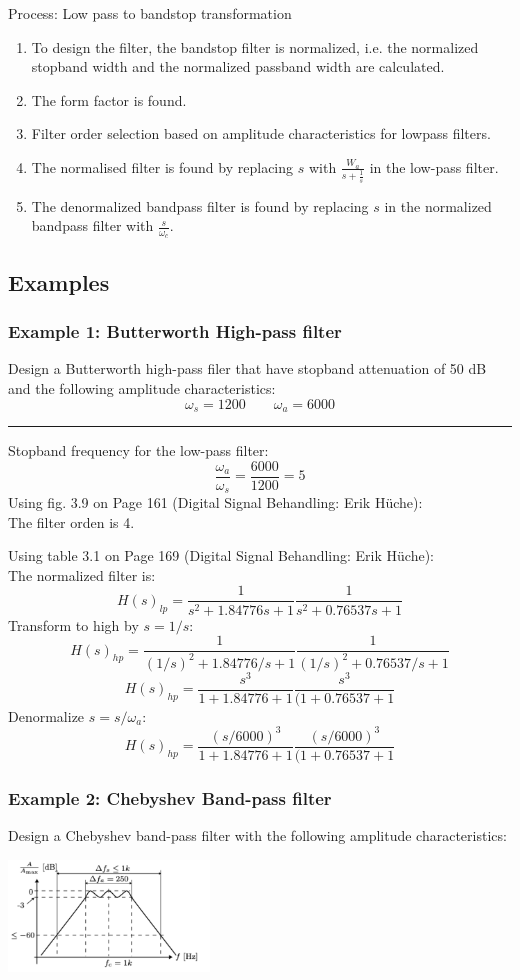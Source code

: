 Process: Low pass to bandstop transformation
\begin{enumerate}
  \item To design the filter, the bandstop filter is normalized, i.e. the normalized stopband width and the normalized passband width are calculated.
  \item The form factor is found.
  \item Filter order selection based on amplitude characteristics for lowpass filters.
  \item The normalised filter is found by replacing $s$ with $\frac{W_{a}}{s+\frac{1}{s}}$ in the low-pass filter.
  \item The denormalized bandpass filter is found by replacing $s$ in the normalized bandpass filter with $\frac{s}{\omega_{c}}$.
\end{enumerate}

\subsection{Examples}
\subsubsection{Example 1: Butterworth High-pass filter}
Design a Butterworth high-pass filer that have stopband attenuation of 50 dB and the following amplitude characteristics:
$$\omega_s=1200\qquad \omega_a=6000$$

\rule{\textwidth}{0.5pt}

Stopband frequency for the low-pass filter:
$$\frac{\omega_a}{\omega_s}=\frac{6000}{1200}=5$$
Using fig. 3.9 on Page 161 (Digital Signal Behandling: Erik Hüche):\\
The filter orden is 4.

Using table 3.1 on Page 169 (Digital Signal Behandling: Erik Hüche):\\
The normalized filter is:
$$H(s)_{lp}=\frac{1}{s^2+1.84776s+1}\frac{1}{s^2+0.76537s+1}$$
Transform to high by $s=1/s$:
$$H(s)_{hp}=\frac{1}{(1/s)^2+1.84776/s+1}\frac{1}{(1/s)^2+0.76537/s+1}$$
$$H(s)_{hp}=\frac{s^3}{1+1.84776+1}\frac{s^3}{(1+0.76537+1}$$
Denormalize $s=s/\omega_a$:
$$H(s)_{hp}=\frac{(s/6000)^3}{1+1.84776+1}\frac{(s/6000)^3}{(1+0.76537+1}$$

\subsubsection{Example 2: Chebyshev Band-pass filter}
Design a Chebyshev band-pass filter with the following amplitude characteristics:
\begin{center}
  \includegraphics[width=0.4\textwidth]{Images/Chev-bandpass-ex.png}
\end{center}

